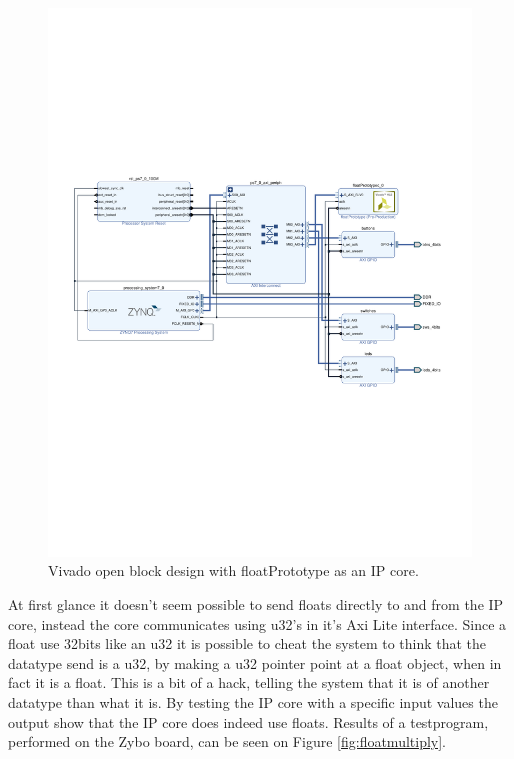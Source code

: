 \begin{figure}[H]
	\centering
	\includegraphics[trim={0 240 0 240},clip,width=1\linewidth]{diagram/VivadoBlockDesign_with_ip_core}
	\caption{Vivado open block design with floatPrototype as an IP core.}
	\label{fig:vivadoblockdesignwithipcore}
\end{figure}

At first glance it doesn't seem possible to send floats directly to and from the IP core, instead the core communicates using u32's in it's Axi Lite interface. Since a float use 32bits like an u32 it is possible to cheat the system to think that the datatype send is a u32, by making a u32 pointer point at a float object, when in fact it is a float. This is a bit of a hack, telling the system that it is of another datatype than what it is. By testing the IP core with a specific input values the output show that the IP core does indeed use floats. Results of a testprogram, performed on the Zybo board, can be seen on Figure \ref{fig:floatmultiply}.\\

